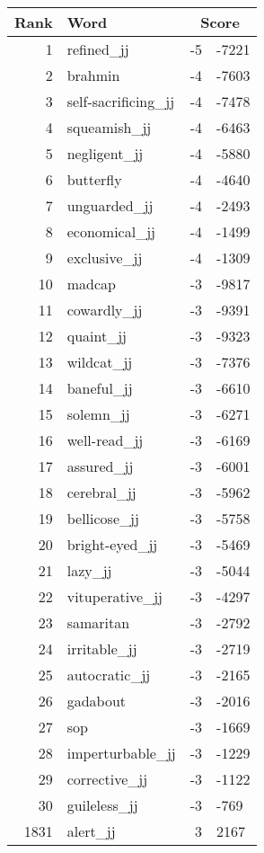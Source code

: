 \begin{longtable}[!htbp]{| rlr@{.}l |}
    \hline
    \textbf{Rank} & \textbf{Word} & \multicolumn{2}{c|}{\textbf{Score}} \\
    \hline
    \endhead
    1 & refined\_jj & -5 & -7221 \\
    2 & brahmin & -4 & -7603 \\
    3 & self-sacrificing\_jj & -4 & -7478 \\
    4 & squeamish\_jj & -4 & -6463 \\
    5 & negligent\_jj & -4 & -5880 \\
    6 & butterfly & -4 & -4640 \\
    7 & unguarded\_jj & -4 & -2493 \\
    8 & economical\_jj & -4 & -1499 \\
    9 & exclusive\_jj & -4 & -1309 \\
    10 & madcap & -3 & -9817 \\
    11 & cowardly\_jj & -3 & -9391 \\
    12 & quaint\_jj & -3 & -9323 \\
    13 & wildcat\_jj & -3 & -7376 \\
    14 & baneful\_jj & -3 & -6610 \\
    15 & solemn\_jj & -3 & -6271 \\
    16 & well-read\_jj & -3 & -6169 \\
    17 & assured\_jj & -3 & -6001 \\
    18 & cerebral\_jj & -3 & -5962 \\
    19 & bellicose\_jj & -3 & -5758 \\
    20 & bright-eyed\_jj & -3 & -5469 \\
    21 & lazy\_jj & -3 & -5044 \\
    22 & vituperative\_jj & -3 & -4297 \\
    23 & samaritan & -3 & -2792 \\
    24 & irritable\_jj & -3 & -2719 \\
    25 & autocratic\_jj & -3 & -2165 \\
    26 & gadabout & -3 & -2016 \\
    27 & sop & -3 & -1669 \\
    28 & imperturbable\_jj & -3 & -1229 \\
    29 & corrective\_jj & -3 & -1122 \\
    30 & guileless\_jj & -3 & -769 \\
    1831 & alert\_jj & 3 & 2167 \\

\end{longtable}
